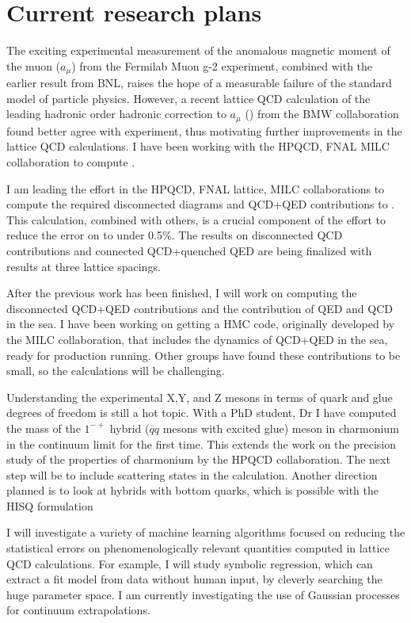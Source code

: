 \section{Current research plans}

The exciting experimental measurement of the anomalous magnetic
moment of the muon ($a_\mu$) from the Fermilab Muon g-2  experiment,
combined with the
earlier result from BNL, raises the hope of a measurable failure of the
standard model of particle physics.  However, a recent lattice QCD
calculation of the leading hadronic order hadronic correction to
$a_\mu$
(\amu)
from the BMW collaboration found better agree with experiment,
thus motivating further improvements in the lattice QCD
calculations. I have been working with the HPQCD, FNAL MILC
collaboration to compute \amu.

I am leading the effort in the HPQCD, FNAL lattice, MILC
collaborations to compute the required disconnected diagrams and
QCD+QED contributions to \amu. This calculation, combined with
others, is a crucial component of the effort to reduce the error on \amu
to under 0.5\%.
The results on disconnected QCD contributions and connected
QCD+quenched QED are being finalized with results at three lattice spacings.

After the previous work has been finished, I will work on
computing the disconnected QCD+QED contributions and the contribution
of QED and QCD in the sea. I have been working on getting a HMC
code, originally developed by the MILC collaboration, that includes
the dynamics of QCD+QED in the sea, ready for production running.
Other groups have found these contributions to be small, so the
calculations will be challenging. 




Understanding the experimental X,Y, and Z mesons in terms of quark and
glue degrees of freedom is still a hot topic. With a PhD student, Dr
I have computed the mass of the $1^{-+}$ hybrid ($\overline{q}q$
mesons with excited glue) meson in charmonium in the continuum limit
for the first time. This extends the work on the precision study of
the properties of charmonium by the HPQCD collaboration.
The next step will be to include scattering states in the calculation.
Another direction planned is to look at hybrids with bottom quarks,
which is possible with the HISQ formulation 

I will investigate a variety of machine learning algorithms
focused on reducing the statistical errors on phenomenologically
relevant quantities computed in lattice QCD calculations. For example,
I will study symbolic regression, which can extract a fit model from
data without human input, by cleverly searching the huge parameter
space. I am currently investigating the use of Gaussian processes
for continuum extrapolations.

